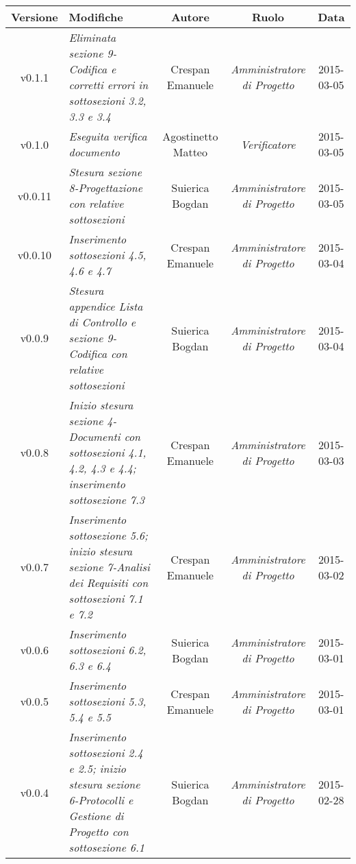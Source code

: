 \newpage
\begin{table}[h]
\centering
\begin{tabular}{|c|p{}|c|c|c|}
	\toprule
		\textbf{Versione} & \textbf{Modifiche} & \textbf{Autore} & \textbf{Ruolo} & \textbf{Data} \\
	\midrule
	\midrule
		v0.1.1 & \textit{Eliminata sezione 9-Codifica e corretti errori in sottosezioni 3.2, 3.3 e 3.4} & Crespan Emanuele & \textit{Amministratore di Progetto} & 2015-03-05\\
	\midrule
		v0.1.0 & \textit{Eseguita verifica documento} & Agostinetto Matteo & \textit{Verificatore} & 2015-03-05\\
	\midrule
		v0.0.11 & \textit{Stesura sezione 8-Progettazione con relative sottosezioni} & Suierica Bogdan & \textit{Amministratore di Progetto} & 2015-03-05\\
	\midrule
		v0.0.10 & \textit{Inserimento sottosezioni 4.5, 4.6 e 4.7} & Crespan Emanuele & \textit{Amministratore di Progetto} & 2015-03-04\\
	\midrule
		v0.0.9 & \textit{Stesura appendice Lista di Controllo e sezione 9-Codifica con relative sottosezioni} & Suierica Bogdan & \textit{Amministratore di Progetto} & 2015-03-04\\
	\midrule
		v0.0.8 & \textit{Inizio stesura sezione 4-Documenti con sottosezioni 4.1, 4.2, 4.3 e 4.4; inserimento sottosezione 7.3} & Crespan Emanuele & \textit{Amministratore di Progetto} & 2015-03-03\\
	\midrule
		v0.0.7 & \textit{Inserimento sottosezione 5.6; inizio stesura sezione 7-Analisi dei Requisiti con sottosezioni 7.1 e 7.2} & Crespan Emanuele & \textit{Amministratore di Progetto} & 2015-03-02\\
	\midrule
		v0.0.6 & \textit{Inserimento sottosezioni 6.2, 6.3 e 6.4} & Suierica Bogdan & \textit{Amministratore di Progetto} & 2015-03-01\\
	\midrule
		v0.0.5 & \textit{Inserimento sottosezioni 5.3, 5.4 e 5.5} & Crespan Emanuele & \textit{Amministratore di Progetto} & 2015-03-01\\
	\midrule
		v0.0.4 & \textit{Inserimento sottosezioni 2.4 e 2.5; inizio stesura sezione 6-Protocolli e Gestione di Progetto con sottosezione 6.1} & Suierica Bogdan & \textit{Amministratore di Progetto} & 2015-02-28\\
	\bottomrule
\end{tabular}
\end{table}
\newpage
